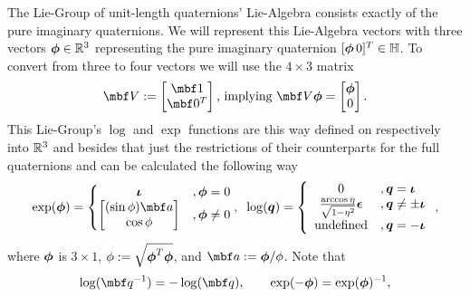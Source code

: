 \documentclass[11pt,a4paper,oneside]{article}
\begin{document}
The Lie-Group of unit-length quaternions' Lie-Algebra consists exactly of the pure imaginary quaternions. We will represent this Lie-Algebra vectors with three vectors ${\boldsymbol{\phi}} \in \mathbb R^3$ representing the pure imaginary quaternion $[ {\boldsymbol{\phi}} \, 0]^T \in \mathbb H$. To convert from three to four vectors we will use the $4\times 3$ matrix
\begin{equation}
  \label{eq:defV}
  \mbf V := \bbm \mbf 1 \\ \mbf 0^T \ebm \text{, implying } \mbf V\mbs\phi = \bbm \mbs \phi \\ 0 \ebm.
\end{equation}
This Lie-Group's $\log$ and $\exp$ functions are this way defined on respectively into $\mathbb R^3$ and besides that just the restrictions of their counterparts for the full quaternions and can be calculated the following way
\begin{equation}
	\label{eq:qexplog}
	\exp(\mbs \phi) = 
		\left\{\begin{matrix}
			\mbs{\iota}&, \mbs\phi = 0\\ 
			\bbm (\sin \phi) \mbf a \\ \cos \phi \ebm &, \mbs\phi \not = 0 
		\end{matrix}\right.,
	\;\; 
	\log(\mbs q) = 
		\left\{\begin{array}{cl}
			0 &, \mbs q = \mbs{\iota} \\
			\frac{\arccos \eta}{\sqrt{1 - \eta^2}}\mbs \epsilon &, \mbs q \not = \pm\mbs{\iota}\\ 
			\text{undefined} &, \mbs q = -\mbs{\iota}
		\end{array}\right.
	,
\end{equation}
where ${\boldsymbol{\phi}}$ is $3\times 1$, $\phi := \sqrt{{\boldsymbol{\phi}}^T {\boldsymbol{\phi}}}$, and $\mbf a := \mbs \phi / \phi$. Note that
\begin{equation}
  \label{eq:log-exp-identities}
  \log(\mbf q^{-1}) = -\log(\mbf q), \qquad \exp(-\mbs \phi) = \exp(\mbs\phi)^{-1},
\end{equation}
\end{document}
